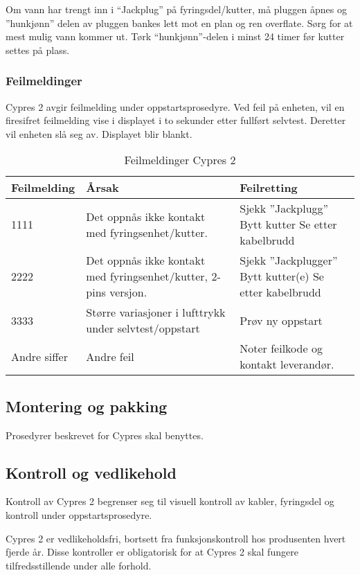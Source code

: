 Om vann har trengt inn i ``Jackplug'' på fyringsdel/kutter, må pluggen åpnes og ”hunkjønn” delen av pluggen bankes lett mot en plan og ren overflate. Sørg for at mest mulig vann kommer ut. Tørk ``hunkjønn''-delen i minst 24 timer før kutter settes på plass.

\subsubsection{Feilmeldinger}
Cypres 2 avgir feilmelding under oppstartsprosedyre. Ved feil på enheten, vil en firesifret feilmelding vise i displayet i to sekunder etter fullført selvtest. Deretter vil enheten slå seg av. Displayet blir blankt.

\begin{table}
	\caption{Feilmeldinger Cypres 2}
	\begin{tabular}{ | p{2cm} | p{5cm} | p{3cm} | }
		\hline
		Feilmelding & Årsak & Feilretting \\
		\hline
		1111 & Det oppnås ikke kontakt med fyringsenhet/kutter. & Sjekk ”Jackplugg” Bytt kutter Se etter kabelbrudd \\
		\hline
		2222 & Det oppnås ikke kontakt med fyringsenhet/kutter, 2-pins versjon. & Sjekk ”Jackplugger” Bytt kutter(e) Se etter kabelbrudd\\
		\hline
		3333 & Større variasjoner i lufttrykk under selvtest/oppstart & Prøv ny oppstart \\
		\hline
		Andre siffer & Andre feil & Noter feilkode og kontakt leverandør. \\
		\hline
	\end{tabular}
\end{table}

\subsection{Montering og pakking}
Prosedyrer beskrevet for Cypres skal benyttes.

\subsection{Kontroll og vedlikehold}
Kontroll av Cypres 2 begrenser seg til visuell kontroll av kabler, fyringsdel og kontroll under oppstartsprosedyre.

Cypres 2 er vedlikeholdsfri, bortsett fra funksjonskontroll hos produsenten hvert fjerde år. Disse kontroller er obligatorisk for at Cypres 2 skal fungere tilfredsstillende under alle forhold.


